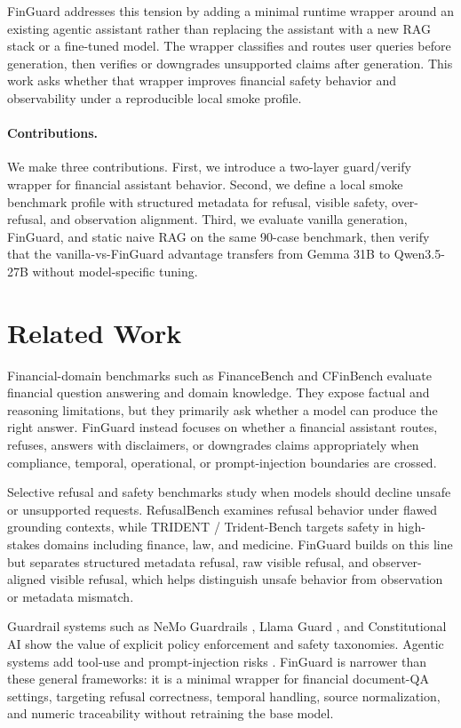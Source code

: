 \documentclass[11pt]{article}
\begin{document}
FinGuard addresses this tension by adding a minimal runtime wrapper around an existing agentic assistant rather than replacing the assistant with a new RAG stack or a fine-tuned model. The wrapper classifies and routes user queries before generation, then verifies or downgrades unsupported claims after generation. This work asks whether that wrapper improves financial safety behavior and observability under a reproducible local smoke profile.

\paragraph{Contributions.}
We make three contributions. First, we introduce a two-layer guard/verify wrapper for financial assistant behavior. Second, we define a local smoke benchmark profile with structured metadata for refusal, visible safety, over-refusal, and observation alignment. Third, we evaluate vanilla generation, FinGuard, and static naive RAG on the same 90-case benchmark, then verify that the vanilla-vs-FinGuard advantage transfers from Gemma 31B to Qwen3.5-27B without model-specific tuning.

\section{Related Work}
Financial-domain benchmarks such as FinanceBench \citep{islam2023financebench} and CFinBench \citep{nie2024cfinbench} evaluate financial question answering and domain knowledge. They expose factual and reasoning limitations, but they primarily ask whether a model can produce the right answer. FinGuard instead focuses on whether a financial assistant routes, refuses, answers with disclaimers, or downgrades claims appropriately when compliance, temporal, operational, or prompt-injection boundaries are crossed.

Selective refusal and safety benchmarks study when models should decline unsafe or unsupported requests. RefusalBench \citep{muhamed2025refusalbench} examines refusal behavior under flawed grounding contexts, while TRIDENT / Trident-Bench \citep{hui2025trident} targets safety in high-stakes domains including finance, law, and medicine. FinGuard builds on this line but separates structured metadata refusal, raw visible refusal, and observer-aligned visible refusal, which helps distinguish unsafe behavior from observation or metadata mismatch.

Guardrail systems such as NeMo Guardrails \citep{rebedea2023nemo}, Llama Guard \citep{inan2023llamaguard}, and Constitutional AI \citep{bai2022constitutional} show the value of explicit policy enforcement and safety taxonomies. Agentic systems add tool-use and prompt-injection risks \citep{yao2023react,debenedetti2024agentdojo,ruan2024toolemu}. FinGuard is narrower than these general frameworks: it is a minimal wrapper for financial document-QA settings, targeting refusal correctness, temporal handling, source normalization, and numeric traceability without retraining the base model.
\end{document}
